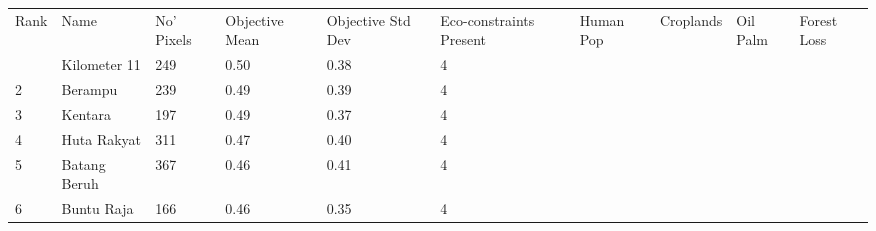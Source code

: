 \begin{table}[ht]
\centering
\begingroup\fontsize{9pt}{10pt}\selectfont
\begin{tabular}{C{0.05\textwidth}C{0.15\textwidth}C{0.08\textwidth}C{0.08\textwidth}C{0.08\textwidth}C{0.08\textwidth}C{0.08\textwidth}C{0.08\textwidth}C{0.08\textwidth}C{0.08\textwidth}}
 Rank & Name & No' Pixels & Objective Mean & Objective Std Dev & Eco-constraints  Present & Human Pop & Croplands & Oil Palm & Forest Loss \\ 
  & Kilometer 11 & 249 & \textcolor[HTML]{FFFFFF}{0.50} & \textcolor[HTML]{FFFFFF}{0.38} & \textcolor[HTML]{000000}{4} &  &  &  &  \\ 
  {2} & Berampu & 239 & \textcolor[HTML]{FFFFFF}{0.49} & \textcolor[HTML]{FFFFFF}{0.39} & \textcolor[HTML]{000000}{4} &  &  &  &  \\ 
  {3} & Kentara & 197 & \textcolor[HTML]{FFFFFF}{0.49} & \textcolor[HTML]{FFFFFF}{0.37} & \textcolor[HTML]{000000}{4} &  &  &  &  \\ 
  {4} & Huta Rakyat & 311 & \textcolor[HTML]{FFFFFF}{0.47} & \textcolor[HTML]{FFFFFF}{0.40} & \textcolor[HTML]{000000}{4} &  &  &  &  \\ 
  {5} & Batang Beruh & 367 & \textcolor[HTML]{000000}{0.46} & \textcolor[HTML]{FFFFFF}{0.41} & \textcolor[HTML]{000000}{4} &  &  &  &  \\ 
  {6} & Buntu Raja & 166 & \textcolor[HTML]{000000}{0.46} & \textcolor[HTML]{000000}{0.35} & \textcolor[HTML]{000000}{4} &  &  &  &  \\ 

\end{tabular}
\end{table}
